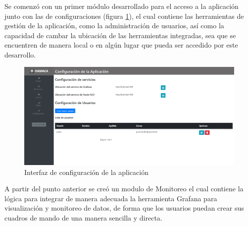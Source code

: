 Se comenzó con un primer módulo desarrollado para el acceso a la aplicación 
junto con las de configuraciones (figura \ref{fig:hamaca_config}), el cual contiene las herramientas de gestión de la aplicación, como la administración de usuarios, así como la capacidad de cambar la ubicación de las herramientas integradas, sea que se encuentren de manera local o en algún lugar que pueda ser accedido por este desarrollo.\\

\begin{figure}[htb]
\centering
\includegraphics[scale=0.2]{./Figuras/hamaca_config.png}
\caption{Interfaz de configuración de la aplicación}
\label{fig:hamaca_config}
\vspace*{-10pt}
\end{figure}

A partir del punto anterior se creó un modulo de Monitoreo el cual contiene la lógica para integrar de manera adecuada la herramienta Grafana para visualización y monitoreo de datos, de forma que los usuarios puedan crear sus cuadros de mando de una manera sencilla y directa.\\ %


